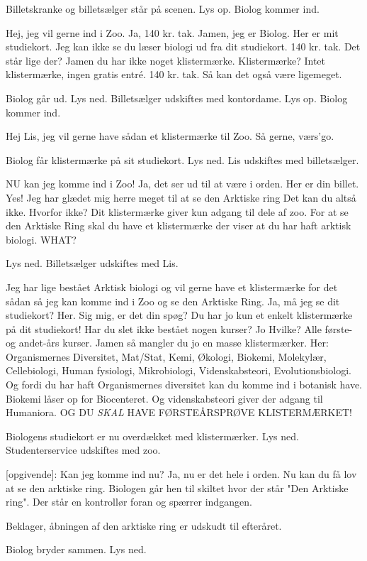 \documentclass[a4paper,12pt]{article}
\begin{document}
\begin{sketch}

\scene Billetskranke og billetsælger står på scenen. Lys op. Biolog kommer ind.

 Hej, jeg vil gerne ind i Zoo.
 Ja, 140 kr. tak.
 Jamen, jeg er Biolog. Her er mit studiekort.
 Jeg kan ikke se du læser biologi ud fra dit studiekort. 140 kr. tak.
 Det står lige der?
 Jamen du har ikke noget klistermærke.
 Klistermærke?
 Intet klistermærke, ingen gratis entré. 140 kr. tak.
 Så kan det også være ligemeget.

\scene Biolog går ud. Lys ned. Billetsælger udskiftes med kontordame. Lys op. Biolog kommer ind.

 Hej Lis, jeg vil gerne have sådan et klistermærke til Zoo.
 Så gerne, værs'go.

\scene Biolog får klistermærke på sit studiekort. Lys ned. Lis udskiftes med billetsælger.

 NU kan jeg komme ind i Zoo! 
 Ja, det ser ud til at være i orden. Her er din billet.
 Yes! Jeg har glædet mig herre meget til at se den Arktiske ring
 Det kan du altså ikke.
 Hvorfor ikke?
 Dit klistermærke giver kun adgang til dele af zoo. For at se den Arktiske Ring skal du have et klistermærke der viser at du har haft arktisk biologi.
 WHAT?

\scene Lys ned. Billetsælger udskiftes med Lis.

 Jeg har lige bestået Arktisk biologi og vil gerne have et klistermærke for det sådan så jeg kan komme ind i Zoo og se den Arktiske Ring.
 Ja, må jeg se dit studiekort?
 Her.
 Sig mig, er det din spøg? Du har jo kun et enkelt klistermærke på dit studiekort! Har du slet ikke bestået nogen kurser?
 Jo
 Hvilke?
 Alle første- og andet-års kurser.
 Jamen så mangler du jo en masse klistermærker. Her: Organismernes Diversitet, Mat/Stat, Kemi, Økologi, Biokemi, Molekylær, Cellebiologi, Human fysiologi, Mikrobiologi, Videnskabsteori, Evolutionsbiologi. Og fordi du har haft Organismernes diversitet kan du komme ind i botanisk have. Biokemi låser op for Biocenteret. Og videnskabsteori giver der adgang til Humaniora. OG DU \emph{SKAL} HAVE FØRSTEÅRSPRØVE KLISTERMÆRKET!

\scene Biologens studiekort er nu overdækket med klistermærker. Lys ned. Studenterservice udskiftes med zoo.

[opgivende]: Kan jeg komme ind nu?
 Ja, nu er det hele i orden. Nu kan du få lov at se den arktiske ring.
\scene Biologen går hen til skiltet hvor der står "Den Arktiske ring". Der står en kontrollør foran og spærrer indgangen.

 Beklager, åbningen af den arktiske ring er udskudt til efteråret.

\scene Biolog bryder sammen. Lys ned.





\end{sketch}
\end{document}

